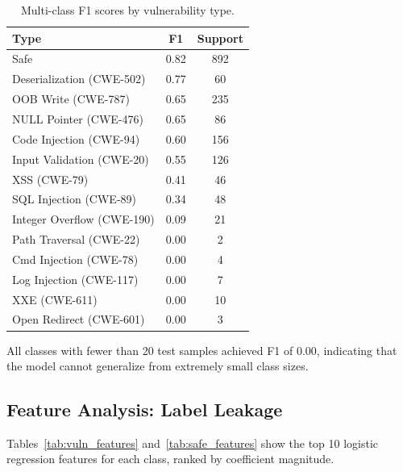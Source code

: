\documentclass[11pt,a4paper]{article}
\begin{document}
\begin{table}[H]
\centering
\caption{Multi-class F1 scores by vulnerability type.}
\label{tab:multiclass}
\begin{tabular}{lcc}
\toprule
\textbf{Type} & \textbf{F1} & \textbf{Support} \\
\midrule
Safe & 0.82 & 892 \\
Deserialization (CWE-502) & 0.77 & 60 \\
OOB Write (CWE-787) & 0.65 & 235 \\
NULL Pointer (CWE-476) & 0.65 & 86 \\
Code Injection (CWE-94) & 0.60 & 156 \\
Input Validation (CWE-20) & 0.55 & 126 \\
XSS (CWE-79) & 0.41 & 46 \\
SQL Injection (CWE-89) & 0.34 & 48 \\
Integer Overflow (CWE-190) & 0.09 & 21 \\
Path Traversal (CWE-22) & 0.00 & 2 \\
Cmd Injection (CWE-78) & 0.00 & 4 \\
Log Injection (CWE-117) & 0.00 & 7 \\
XXE (CWE-611) & 0.00 & 10 \\
Open Redirect (CWE-601) & 0.00 & 3 \\
\bottomrule
\end{tabular}
\end{table}

All classes with fewer than 20 test samples achieved F1 of 0.00, indicating that the model cannot generalize from extremely small class sizes.

\subsection{Feature Analysis: Label Leakage}

Tables~\ref{tab:vuln_features} and~\ref{tab:safe_features} show the top 10 logistic regression features for each class, ranked by coefficient magnitude.
\end{document}
